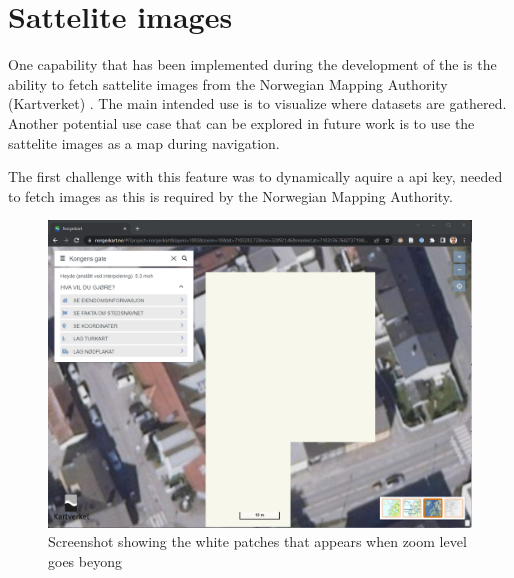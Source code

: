 \section{Sattelite images}
One capability that has been implemented during the development of the \gui is the ability to fetch sattelite images from the Norwegian Mapping Authority (Kartverket) \cite{kartverketNorgeskart}.
The main intended use is to visualize where datasets are gathered.
Another potential use case that can be explored in future work is to use the sattelite images as a map during navigation.

The first challenge with this feature was to dynamically aquire a api key, needed to fetch images as this is required by the Norwegian Mapping Authority.


\begin{figure}
    \centering
    \includegraphics[width=\textwidth]{figures/norgeskart_bug.png}
    \caption{Screenshot showing the white patches that appears when zoom level goes beyong \todo \cite{kartverketNorgeskart}}
    \label{fig:norgeskart_bug}
\end{figure}